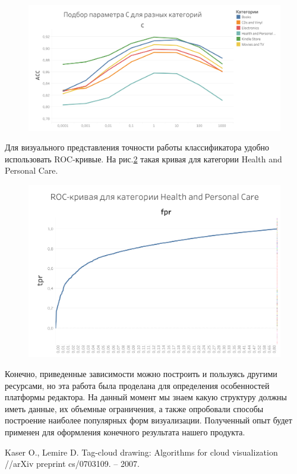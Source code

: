 \documentclass[a4paper,12pt]{article}
\begin{document}
\begin{figure}[h]
	\centering
	\includegraphics[width=0.9\linewidth]{c}
 
	\label{fig:c}
\end{figure} 
Для визуального представления точности работы классификатора удобно использовать ROC-кривые. На рис.\ref{fig:roc} такая кривая для категории Health and Personal Care. 

\begin{figure}[h]
	\centering
	\includegraphics[width=0.9\linewidth]{roc}
 
	\label{fig:roc}
\end{figure} 
Конечно, приведенные зависимости можно построить и пользуясь другими ресурсами, но эта работа была проделана для определения особенностей платформы редактора. На данный момент мы знаем какую структуру должны иметь данные, их объемные ограничения, а также опробовали способы построение наиболее популярных форм визуализации. Полученный опыт будет применен для оформления конечного результата нашего продукта. 

\begin{thebibliography}{9}
	 Kaser O., Lemire D. Tag-cloud drawing: Algorithms for cloud visualization //arXiv preprint cs/0703109. – 2007.
\end{thebibliography}
\end{document}
